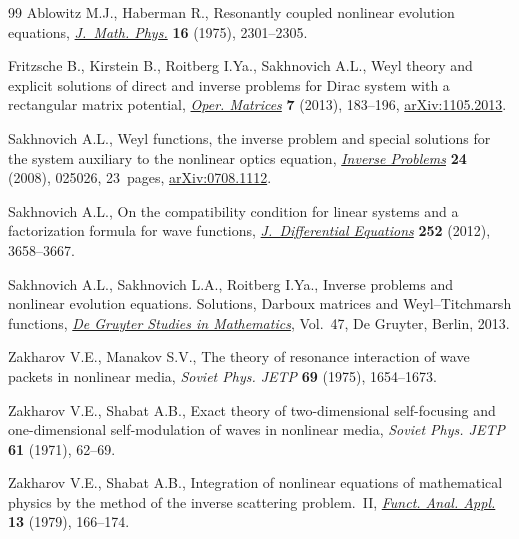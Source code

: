 \documentclass[11pt]{article}
\numberwithin{equation}{section}
\begin{document}
\begin{thebibliography}{99}
Ablowitz M.J., Haberman R., Resonantly coupled nonlinear evolution equations,
 \href{http://dx.doi.org/10.1063/1.522460}{\textit{J.~Math. Phys.}} \textbf{16} (1975), 2301--2305.

Fritzsche B., Kirstein B., Roitberg I.Ya., Sakhnovich A.L., Weyl theory and
 explicit solutions of direct and inverse problems for {D}irac system with a
 rectangular matrix potential, \href{http://dx.doi.org/10.7153/oam-07-10}{\textit{Oper. Matrices}} \textbf{7} (2013),
 183--196, \href{http://arxiv.org/abs/1105.2013}{arXiv:1105.2013}.

Sakhnovich A.L., Weyl functions, the inverse problem and special solutions for
 the system auxiliary to the nonlinear optics equation, \href{http://dx.doi.org/10.1088/0266-5611/24/2/025026}{\textit{Inverse
 Problems}} \textbf{24} (2008), 025026, 23~pages, \href{http://arxiv.org/abs/0708.1112}{arXiv:0708.1112}.

Sakhnovich A.L., On the compatibility condition for linear systems and a
 factorization formula for wave functions, \href{http://dx.doi.org/10.1016/j.jde.2011.11.001}{\textit{J.~Differential Equations}}
 \textbf{252} (2012), 3658--3667.

Sakhnovich A.L., Sakhnovich L.A., Roitberg I.Ya., Inverse problems and nonlinear
 evolution equations. Solutions, Darboux matrices and Weyl--Titchmarsh
 functions, \href{http://dx.doi.org/10.1515/9783110258615}{\textit{De Gruyter Studies in Mathematics}}, Vol.~47, De Gruyter,
 Berlin, 2013.

Zakharov V.E., Manakov S.V., The theory of resonance interaction of wave
 packets in nonlinear media, \textit{Soviet Phys. JETP} \textbf{69} (1975),
 1654--1673.

Zakharov V.E., Shabat A.B., Exact theory of two-dimensional self-focusing and
 one-dimensional self-modulation of waves in nonlinear media, \textit{Soviet
 Phys. JETP} \textbf{61} (1971), 62--69.

Zakharov V.E., Shabat A.B., Integration of nonlinear equations of mathematical
 physics by the method of the inverse scattering problem.~{II}, \href{http://dx.doi.org/10.1007/BF01077483}{\textit{Funct.
 Anal. Appl.}} \textbf{13} (1979), 166--174.

\end{thebibliography}
\end{document}
